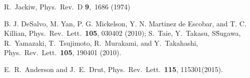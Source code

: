\documentclass[twocolumn,secnumarabic,amssymb, nobibnotes, aps, prd]{revtex4}
\begin{document}
\begin{thebibliography}{99}
R.~Jackiw, 
Phys.\ Rev.\ D {\bf 9},\ 1686 (1974)

   B. J. DeSalvo, M. Yan, P. G. Mickelson, Y. N. Martinez de Escobar, and
T. C. Killian, Phys.\ Rev.\ Lett.\ {\bf 105}, 030402 (2010); 
S.\ Taie, Y.\ Takasu, S\. Sugawa, R.\ Yamazaki, T.\ Tsujimoto, R.\ Murakami,
and Y.\ Takahashi, Phys.\ Rev.\ Lett.\ {\bf 105}, 190401 (2010).

 E.\  R.\  Anderson and J.\ E.\ Drut, Phys.\ 
Rev.\  Lett.\ {\bf 115}, 115301(2015).

   \end{thebibliography}
\end{document}
